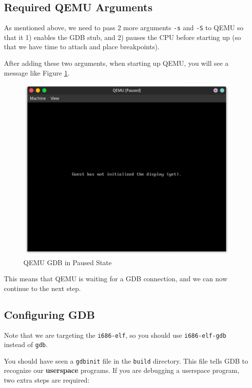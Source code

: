 \subsection{Required QEMU Arguments} \label{sec:qemu-args}

As mentioned above, we need to pass 2 more arguments \texttt{-s} and \texttt{-S} to QEMU so that it
1) enables the GDB stub, and 2) pauses the CPU before starting up (so that we have time to attach and
place breakpoints).

After adding these two arguments, when starting up QEMU, you will see a message like Figure \ref{fig:qemu-gdb-paused}.

\begin{figure}[h]
    \centering
    \includegraphics[width=\textwidth]{assets/c1.mos-qemu-gdb-paused.png}
    \caption{QEMU GDB in Paused State}
    \label{fig:qemu-gdb-paused}
\end{figure}

This means that QEMU is waiting for a GDB connection, and we can now continue to the next step.

\subsection{Configuring GDB} \label{sec:gdb-config}

Note that we are targeting the \texttt{i686-elf}, so you should use \texttt{i686-elf-gdb}
instead of \texttt{gdb}.

You should have seen a \texttt{gdbinit} file in the \texttt{build} directory.
This file tells GDB to recognize our \textbf{userspace} programs. If you are debugging a userspace
program, two extra steps are required:

